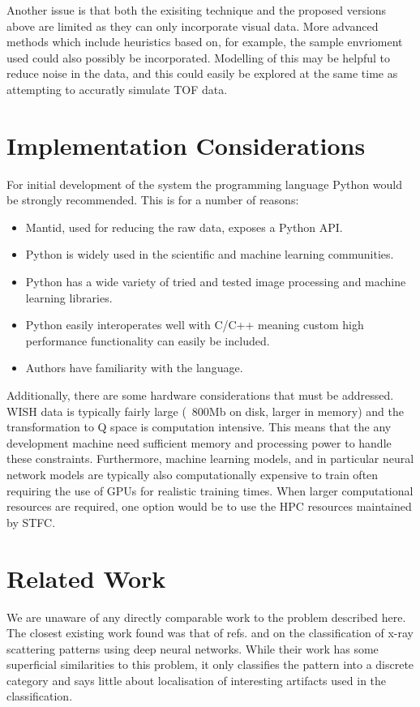 \documentclass[paper=a4, fontsize=8pt]{scrartcl} \usepackage[T1]{fontenc}
\begin{document}
Another issue is that both the exisiting technique and the proposed versions above are 
limited as they can only incorporate visual data. More advanced 
methods which include heuristics based on, for example, the sample envrioment used could also 
possibly be incorporated. Modelling of this may be helpful to reduce
noise in the data, and this could easily be explored at the same time as attempting
to accuratly simulate TOF data.

\section{Implementation Considerations}
For initial development of the system the programming language Python would be
strongly recommended. This is for a number of reasons:

\begin{itemize}
\item Mantid, used for reducing the raw data, exposes a Python API.
\item Python is widely used in the scientific and machine learning communities.
\item Python has a wide variety of tried and tested image processing 
\cite{scikit-image} and machine learning \cite{scikit-learn} \cite{keras} 
libraries.
\item Python easily interoperates well with C/C++ meaning custom high 
performance functionality can easily be included.
\item Authors have familiarity with the language.
\end{itemize}

Additionally, there are some hardware considerations that must be addressed. 
WISH data is typically fairly large (~800Mb on disk, larger in memory) and the
transformation to Q space is computation intensive. This means that the any 
development machine need sufficient memory and processing power to handle these 
constraints. Furthermore, machine learning models, and in particular neural network models are typically also 
computationally expensive to train often requiring the use of GPUs for realistic 
training times. When larger computational resources are required, one option would be
to use the HPC resources maintained by STFC.

\section{Related Work}
We are unaware of any directly comparable work to the problem described here. 
The closest existing work found was that of refs.\cite{kiapour2014materials} and 
\cite{wang2016x} on the classification of x-ray scattering patterns using deep 
neural networks. While their work has some superficial similarities to this 
problem, it only classifies the pattern into a discrete category and says 
little about localisation of interesting artifacts used in the classification.
\end{document}
